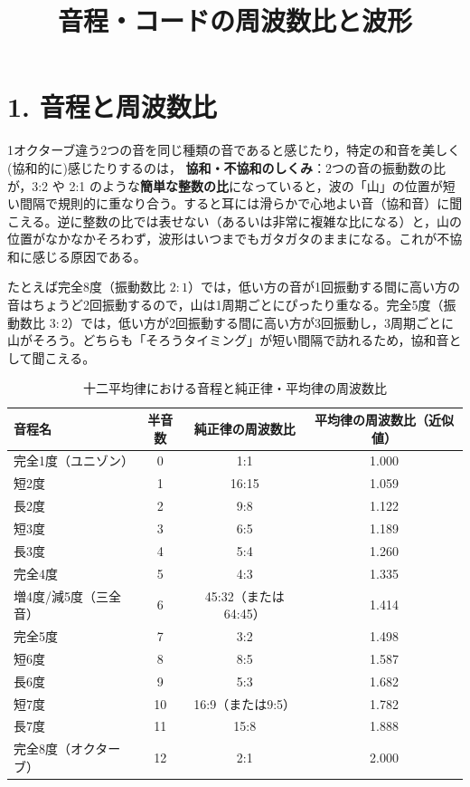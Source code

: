 \documentclass[a4paper]{ltjsarticle}
\title{音程・コードの周波数比と波形}
\author{}
\date{}
\begin{document}
\maketitle

\section*{1. 音程と周波数比}
1オクターブ違う2つの音を同じ種類の音であると感じたり，特定の和音を美しく(協和的に)感じたりするのは，
\textbf{協和・不協和のしくみ}：2つの音の振動数の比が，3:2 や 2:1 のような\textbf{簡単な整数の比}になっていると，波の「山」の位置が短い間隔で規則的に重なり合う。すると耳には滑らかで心地よい音（協和音）に聞こえる。逆に整数の比では表せない（あるいは非常に複雑な比になる）と，山の位置がなかなかそろわず，波形はいつまでもガタガタのままになる。これが不協和に感じる原因である。


たとえば完全8度（振動数比 $2:1$）では，低い方の音が1回振動する間に高い方の音はちょうど2回振動するので，山は1周期ごとにぴったり重なる。完全5度（振動数比 $3:2$）では，低い方が2回振動する間に高い方が3回振動し，3周期ごとに山がそろう。どちらも「そろうタイミング」が短い間隔で訪れるため，協和音として聞こえる。
\begin{table}[htbp]
\centering
\caption{十二平均律における音程と純正律・平均律の周波数比}
\begin{tabular}{lccc}
\toprule
音程名 & 半音数 & 純正律の周波数比 & 平均律の周波数比（近似値） \\
\midrule
完全1度（ユニゾン） & 0  & 1:1                     & 1.000 \\
短2度               & 1  & 16:15                   & 1.059 \\
長2度               & 2  & 9:8                      & 1.122 \\
短3度               & 3  & 6:5                      & 1.189 \\
長3度               & 4  & 5:4                      & 1.260 \\
完全4度             & 5  & 4:3                      & 1.335 \\
増4度/減5度（三全音） & 6  & 45:32（または64:45） & 1.414 \\
完全5度             & 7  & 3:2                      & 1.498 \\
短6度               & 8  & 8:5                      & 1.587 \\
長6度               & 9  & 5:3                      & 1.682 \\
短7度               & 10 & 16:9（または9:5）    & 1.782 \\
長7度               & 11 & 15:8                     & 1.888 \\
完全8度（オクターブ） & 12 & 2:1                     & 2.000 \\
\bottomrule
\end{tabular}
\end{table}
\end{document}
